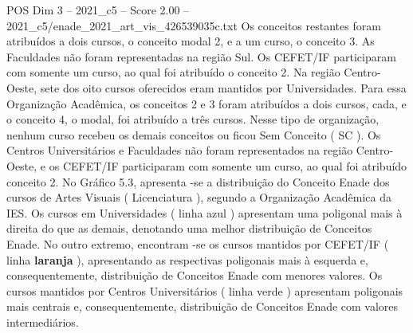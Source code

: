 \begin{textsample}{POS Dim 3 – 2021\_c5 – Score 2.00 – 2021\_c5/enade\_2021\_art\_vis\_426539035c.txt}
Os conceitos restantes foram atribuídos a dois cursos, o conceito modal 2, e a um curso, o conceito 3.
As Faculdades não foram representadas na região Sul.
Os CEFET/IF participaram com somente um curso, ao qual foi atribuído o conceito 2.
Na região Centro-Oeste, sete dos oito cursos oferecidos eram mantidos por Universidades.
Para essa Organização Acadêmica, os conceitos 2 e 3 foram atribuídos a dois cursos, cada, e o conceito 4, o modal, foi atribuído a três cursos.
Nesse tipo de organização, nenhum curso recebeu os demais conceitos ou ficou Sem Conceito ( SC ).
Os Centros Universitários e Faculdades não foram representados na região Centro-Oeste, e os CEFET/IF participaram com somente um curso, ao qual foi atribuído conceito 2.
No Gráfico 5.3, apresenta -se a distribuição do Conceito Enade dos cursos de Artes Visuais ( Licenciatura ), segundo a Organização Acadêmica da IES.
Os cursos em Universidades ( linha azul ) apresentam uma poligonal mais à direita do que as demais, denotando uma melhor distribuição de Conceitos Enade.
No outro extremo, encontram -se os cursos mantidos por CEFET/IF ( linha \textbf{laranja} ), apresentando as respectivas poligonais mais à esquerda e, consequentemente, distribuição de Conceitos Enade com menores valores.
Os cursos mantidos por Centros Universitários ( linha verde ) apresentam poligonais mais centrais e, consequentemente, distribuição de Conceitos Enade com valores intermediários.

\end{textsample}
